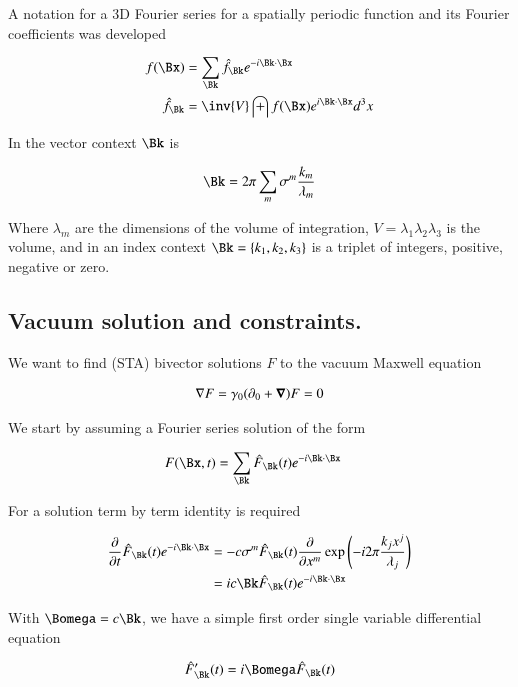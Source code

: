 \documentclass{article}
\begin{document}
A notation for a 3D Fourier series for a spatially periodic function and its Fourier coefficients was developed

\begin{align}
f(\Bx) &= \sum_{\Bk} \hat{f}_{\Bk} e^{ - i \Bk \cdot \Bx } \\
\hat{f}_{\Bk} &= \inv{V} \int f(\Bx) e^{ i \Bk \cdot \Bx } d^3 x
\end{align}

In the vector context $\Bk$ is

\begin{align}
\Bk = 2 \pi \sum_m \sigma^m \frac{k_m}{\lambda_m}
\end{align}

Where $\lambda_m$ are the dimensions of the volume of integration, 
$V = \lambda_1 \lambda_2 \lambda_3$ is the volume, and
in an index context $\Bk = \{k_1, k_2, k_3\}$ is a triplet of integers,
positive, negative or zero.

\subsection{ Vacuum solution and constraints. }

We want to find (STA) bivector solutions $F$ to the vacuum Maxwell equation

\begin{align}\label{eqn:maxwell}
\nabla F = \gamma_0 (\partial_0 + \boldsymbol{\nabla}) F = 0
\end{align}

We start by assuming a Fourier series solution of the form

\begin{align}
F(\Bx,t) &= \sum_{\Bk} \hat{F}_{\Bk}(t) e^{-i \Bk \cdot \Bx} 
\end{align}

For a solution term by term identity is required

\begin{align*}
\PD{t}{} \hat{F}_{\Bk}(t) e^{-i \Bk \cdot \Bx} 
&= -c \sigma^m \hat{F}_{\Bk}(t) \PD{x^m}{} \exp\left(-i 2 \pi \frac{k_j x^j}{ \lambda_j}\right) \\
&= i c \Bk \hat{F}_{\Bk}(t) e^{-i \Bk \cdot \Bx} 
\end{align*}

With $\Bomega = c \Bk$, we have a simple first order single variable differential equation

\begin{align*}
\hat{F}_{\Bk}'(t) = i \Bomega \hat{F}_{\Bk}(t) 
\end{align*}
\end{document}
